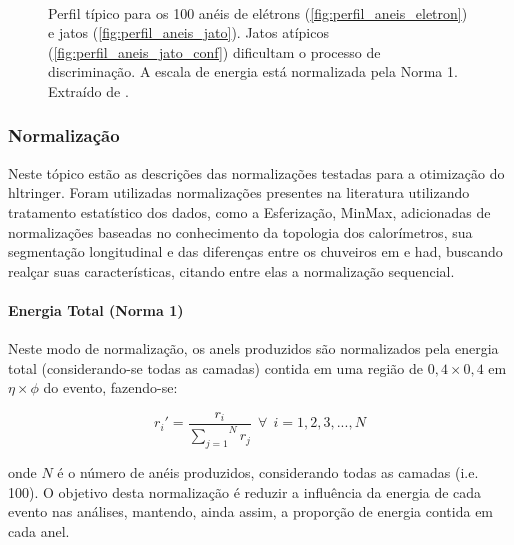 \begin{figure}[ht!]
{  }\\
\caption[Perfil típico para os 100 anéis de elétrons e jatos.]{Perfil típico
para os 100 anéis de elétrons (\ref{fig:perfil_aneis_eletron}) e
jatos (\ref{fig:perfil_aneis_jato}). Jatos atípicos (\ref{fig:perfil_aneis_jato_conf}) 
dificultam o processo de discriminação. A escala de energia está normalizada
pela Norma 1. Extraído de \cite{tese_eduardo}.}
\end{figure}



\subsubsection{Normalização}
\label{sssec:preproc_norm}

Neste tópico estão as descrições das normalizações testadas para a otimização do
\gls{hltringer}. Foram utilizadas normalizações presentes na literatura
utilizando tratamento estatístico dos dados, como a Esferização, MinMax, 
adicionadas de normalizações baseadas no conhecimento da topologia dos calorímetros, 
sua segmentação longitudinal e das diferenças entre os chuveiros \gls{em} e \gls{had}, 
buscando realçar suas características, citando entre elas a normalização
sequencial.

\paragraph{Energia Total (Norma 1)}
\label{par:norm_norm1}

Neste modo de normalização, os \glspl{anel} produzidos são normalizados pela energia total 
(considerando-se todas as camadas) contida em uma região de $0,4 \times 0,4$ em 
$\eta \times \phi$ do evento, fazendo-se:

\begin{equation}
r_{i}' = \frac{r_i}{\overset{N}{\underset{j=1}{\sum}} r_j}~~\forall~~i=1,2,3,...,N
\end{equation}

\noindent onde $N$ é o número de anéis produzidos, considerando todas as camadas (i.e. 100). 
O objetivo desta normalização é reduzir a influência da energia de cada evento nas análises, 
mantendo, ainda assim, a proporção de energia contida em cada anel.

